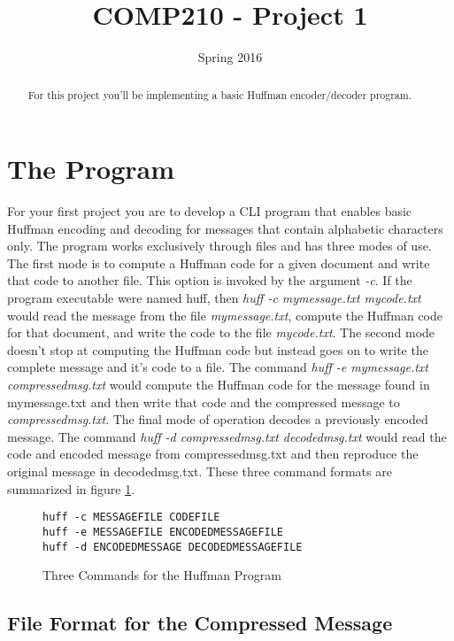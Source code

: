 \documentclass[nobib]{tufte-handout}
\title{COMP210 - Project 1}
\author{}
\date{Spring 2016}
\begin{document}
\maketitle

\begin{abstract}
For this project you'll be implementing a basic Huffman encoder/decoder program. 
\end{abstract}

\section{The Program}

For your first project you are to develop a CLI program that enables basic Huffman encoding and decoding for messages that contain alphabetic characters only. The program works exclusively through files and has three modes of use.  The first mode is to compute a Huffman code for a given document and write that code to another file. This option is invoked by the argument \textit{-c}. If the program executable were named huff, then \textit{huff -c mymessage.txt mycode.txt} would read the message from the file \textit{mymessage.txt}, compute the Huffman code for that document, and write the code to the file \textit{mycode.txt}. The second mode doesn't stop at computing the Huffman code but instead goes on to write the complete message and it's code to a file. The command \textit{huff -e mymessage.txt compressedmsg.txt} would compute the Huffman code for the message found in mymessage.txt and then write that code and the compressed message to \textit{compressedmsg.txt}. The final mode of operation decodes a previously encoded message. The command \textit{huff -d compressedmsg.txt decodedmsg.txt} would read the code and encoded message from compressedmsg.txt and then reproduce the original message in decodedmsg.txt. These three command formats are summarized in figure \ref{fig:cmds}.
\begin{figure}
\begin{verbatim}
huff -c MESSAGEFILE CODEFILE
huff -e MESSAGEFILE ENCODEDMESSAGEFILE
huff -d ENCODEDMESSAGE DECODEDMESSAGEFILE
\end{verbatim}
\caption{Three Commands for the Huffman Program}
\label{fig:cmds}
\end{figure}

\subsection{File Format for the Compressed Message}
\end{document}
